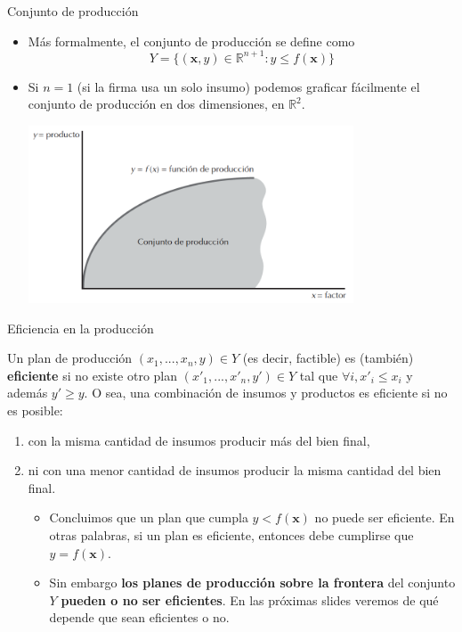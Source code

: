 \documentclass{beamer}
\theoremstyle{definition}
\begin{document}
\begin{frame}{Conjunto de producción}
	\begin{itemize}
		\item Más formalmente, el conjunto de producción se define como
		$$Y=\lbrace (\textbf{x},y) \in \mathbb{R}^{n+1}: y \leq f(\textbf{x}) \rbrace$$
		\item Si $n=1$ (si la firma usa un solo insumo) podemos graficar fácilmente el conjunto de producción en dos dimensiones, en $\mathbb{R}^2$.
		\\
\begin{center}
\includegraphics[width=3.8in]{figures2/prodset.png}
\end{center}
	\end{itemize}
\end{frame}

\begin{frame}{Eficiencia en la producción}

	Un plan de producción $(x_{1},...,x_{n},y) \in Y$ (es decir, factible) es (también) \textbf{eficiente} si no existe otro plan $(x'_{1},...,x'_{n},y') \in Y$ tal que $\forall i, x'_{i}\leq x_{i}$ y además $y'\geq y$. O sea, una combinación de insumos y productos es eficiente si no es posible:
 \begin{enumerate}
     \item con la misma cantidad de insumos producir más del bien final,
     \item ni con una menor cantidad de insumos producir la misma cantidad del bien final.
	\begin{itemize}
	\item Concluimos que un plan que cumpla $y < f(\textbf{x})$ no puede ser eficiente. En otras palabras, si un plan es eficiente, entonces debe cumplirse que $y=f(\textbf{x})$.
	\item Sin embargo \textbf{los planes de producción sobre la frontera} del conjunto $Y$ \textbf{pueden o no ser
eficientes}. En las próximas slides veremos de qué depende que sean eficientes o no.

\end{itemize}
\end{enumerate}
\end{frame}
\end{document}
